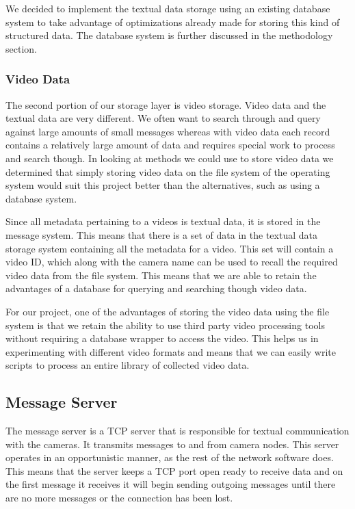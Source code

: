 We decided to implement the textual data storage using an existing database
system to take advantage of optimizations already made for storing this kind of
structured data. The database system is further discussed in the methodology
section.

\subsubsection{Video Data}

The second portion of our storage layer is video storage. Video data and the
textual data are very different. We often want to search through and query
against large amounts of small messages whereas with video data each record
contains a relatively large amount of data and requires special work to process
and search though. In looking at methods we could use to store video data we
determined that simply storing video data on the file system of the operating
system would suit this project better than the alternatives, such as using a
database system.

Since all metadata pertaining to a videos is textual data, it is stored in the
message system. This means that there is a set of data in the textual data
storage system containing all the metadata for a video. This set will contain a
video ID, which along with the camera name can be used to recall the required
video data from the file system. This means that we are able to retain the
advantages of a database for querying and searching though video data.

For our project, one of the advantages of storing the video data using
the file system is that we retain the ability to use third party video
processing tools without requiring a database wrapper to access the video. This
helps us in experimenting with different video formats and means that we can 
easily write scripts to process an entire library of collected video data.


\subsection{Message Server}

The message server is a TCP server that is responsible for textual communication
with the cameras. It transmits messages to and from camera nodes. This server
operates in an opportunistic manner, as the rest of the network software does.
This means that the server keeps a TCP port open ready to receive data and on
the first message it receives it will begin sending outgoing messages until
there are no more messages or the connection has been lost.

